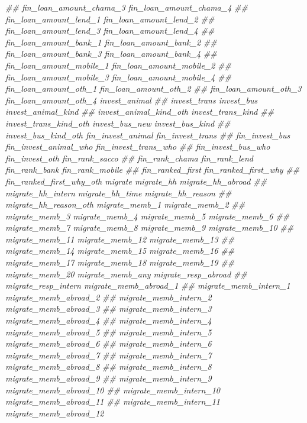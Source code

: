 \documentclass[
]{article}
\newenvironment{Shaded}{\begin{snugshade}}{\end{snugshade}}
\newcommand{\CommentTok}[1]{\textcolor[rgb]{0.56,0.35,0.01}{\textit{#1}}}
\begin{document}
\begin{Shaded}
\begin{Highlighting}[]
\CommentTok{##      fin_loan_amount_chama_3 fin_loan_amount_chama_4}
\CommentTok{##      fin_loan_amount_lend_1 fin_loan_amount_lend_2}
\CommentTok{##      fin_loan_amount_lend_3 fin_loan_amount_lend_4}
\CommentTok{##      fin_loan_amount_bank_1 fin_loan_amount_bank_2}
\CommentTok{##      fin_loan_amount_bank_3 fin_loan_amount_bank_4}
\CommentTok{##      fin_loan_amount_mobile_1 fin_loan_amount_mobile_2}
\CommentTok{##      fin_loan_amount_mobile_3 fin_loan_amount_mobile_4}
\CommentTok{##      fin_loan_amount_oth_1 fin_loan_amount_oth_2}
\CommentTok{##      fin_loan_amount_oth_3 fin_loan_amount_oth_4 invest_animal}
\CommentTok{##      invest_trans invest_bus invest_animal_kind}
\CommentTok{##      invest_animal_kind_oth invest_trans_kind}
\CommentTok{##      invest_trans_kind_oth invest_bus_new invest_bus_kind}
\CommentTok{##      invest_bus_kind_oth fin_invest_animal fin_invest_trans}
\CommentTok{##      fin_invest_bus fin_invest_animal_who fin_invest_trans_who}
\CommentTok{##      fin_invest_bus_who fin_invest_oth fin_rank_sacco}
\CommentTok{##      fin_rank_chama fin_rank_lend fin_rank_bank fin_rank_mobile}
\CommentTok{##      fin_ranked_first fin_ranked_first_why}
\CommentTok{##      fin_ranked_first_why_oth migrate migrate_hh migrate_hh_abroad}
\CommentTok{##      migrate_hh_intern migrate_hh_time migrate_hh_reason}
\CommentTok{##      migrate_hh_reason_oth migrate_memb_1 migrate_memb_2}
\CommentTok{##      migrate_memb_3 migrate_memb_4 migrate_memb_5 migrate_memb_6}
\CommentTok{##      migrate_memb_7 migrate_memb_8 migrate_memb_9 migrate_memb_10}
\CommentTok{##      migrate_memb_11 migrate_memb_12 migrate_memb_13}
\CommentTok{##      migrate_memb_14 migrate_memb_15 migrate_memb_16}
\CommentTok{##      migrate_memb_17 migrate_memb_18 migrate_memb_19}
\CommentTok{##      migrate_memb_20 migrate_memb_any migrate_resp_abroad}
\CommentTok{##      migrate_resp_intern migrate_memb_abroad_1}
\CommentTok{##      migrate_memb_intern_1 migrate_memb_abroad_2}
\CommentTok{##      migrate_memb_intern_2 migrate_memb_abroad_3}
\CommentTok{##      migrate_memb_intern_3 migrate_memb_abroad_4}
\CommentTok{##      migrate_memb_intern_4 migrate_memb_abroad_5}
\CommentTok{##      migrate_memb_intern_5 migrate_memb_abroad_6}
\CommentTok{##      migrate_memb_intern_6 migrate_memb_abroad_7}
\CommentTok{##      migrate_memb_intern_7 migrate_memb_abroad_8}
\CommentTok{##      migrate_memb_intern_8 migrate_memb_abroad_9}
\CommentTok{##      migrate_memb_intern_9 migrate_memb_abroad_10}
\CommentTok{##      migrate_memb_intern_10 migrate_memb_abroad_11}
\CommentTok{##      migrate_memb_intern_11 migrate_memb_abroad_12}

\end{Highlighting}
\end{Shaded}
\end{document}
